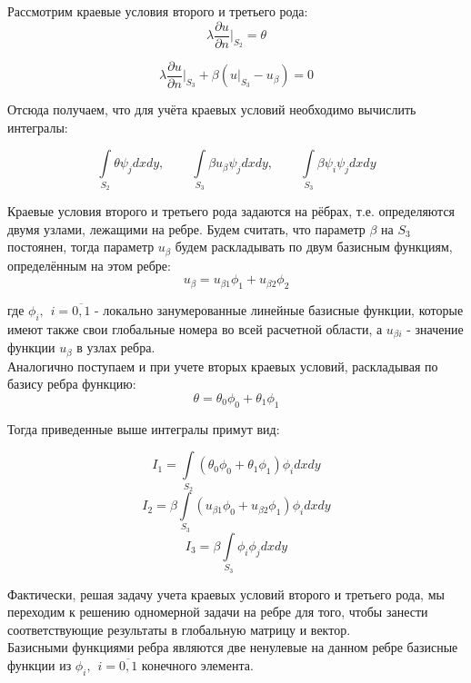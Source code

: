 \documentclass[12pt,a4paper]{article}
\begin{document}
Рассмотрим краевые условия второго и третьего рода:
$$
    \lambda \frac{\partial u}{\partial n}
    \bigg\vert_{S_2} = \theta
$$

$$
    \lambda \frac{\partial u}{\partial n}
    \bigg\vert_{S_3} +
    \beta(u \vert_{S_3} - u_{\beta}) = 0
$$

\noindent Отсюда получаем, что для учёта краевых условий
необходимо вычислить интегралы:

$$
    \int \limits_{S_2} \theta \psi_j dxdy,          \hspace{25pt}
    \int \limits_{S_3} \beta u_{\beta} \psi_j dxdy, \hspace{25pt}
    \int \limits_{S_3} \beta \psi_i \psi_j dxdy
$$

\noindent Краевые условия второго и третьего рода задаются
на рёбрах, т.е. определяются двумя узлами, лежащими на
ребре. Будем считать, что параметр $\beta$ на $S_3$
постоянен, тогда параметр $u_{\beta}$ будем
раскладывать по двум базисным функциям,
определённым на этом ребре:
$$ u_{\beta} = u_{\beta 1} \phi_1 + u_{\beta 2} \phi_2 $$

\noindent где $\phi_i, \hspace{5pt} i=\overline{0,1}$
- локально занумерованные линейные базисные функции,
которые имеют также свои глобальные номера во всей
расчетной области, а $u_{\beta i}$ - значение функции
$u_{\beta}$ в узлах ребра. \\

\noindent Аналогично поступаем и при учете вторых
краевых условий, раскладывая по базису ребра функцию:
$$ \theta = \theta_0 \phi_0 + \theta_1 \phi_1 $$

\noindent Тогда приведенные выше интегралы примут вид:

$$ I_1 = \int \limits_{S_2} (\theta_0 \phi_0 + \theta_1 \phi_1) \phi_i dxdy $$
$$ I_2 = \beta \int \limits_{S_3} (u_{\beta 1} \phi_0 + u_{\beta 2} \phi_1) \phi_i dxdy $$
$$ I_3 = \beta \int \limits_{S_3} \phi_i \phi_j dxdy $$

\noindent Фактически, решая задачу учета краевых условий второго
и третьего рода, мы переходим к решению одномерной
задачи на ребре для того, чтобы занести соответствующие
результаты в глобальную матрицу и вектор. \\

\noindent Базисными функциями ребра являются две
ненулевые на данном ребре базисные функции из
$\phi_i, \hspace{5pt} i=\overline{0,1}$
конечного элемента. \\
\end{document}

